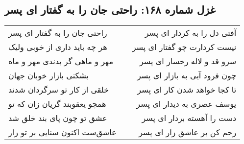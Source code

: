 \begin{center}
\section*{غزل شماره ۱۶۸: راحتی جان را به گفتار ای پسر}
\label{sec:168}
\begin{longtable}{l p{0.5cm} r}
راحتی جان را به گفتار ای پسر
&&
آفتی دل را به کردار ای پسر
\\
هر چه باید داری از خوبی ولیک
&&
نیست کردارت چو گفتار ای پسر
\\
مهر و ماهی گر بدندی مهر و ماه
&&
سرو قد و لاله رخسار ای پسر
\\
بشکنی بازار خوبان جهان
&&
چون فرود آیی به بازار ای پسر
\\
خلقی از کار تو سرگردان شدند
&&
تا کجا خواهد شدن کار ای پسر
\\
همچو یعقوبند گریان زان که تو
&&
یوسف عصری به دیدار ای پسر
\\
عشق تو چون پای بند خلق شد
&&
دست را آهسته بردار ای پسر
\\
عاشق‌ست اکنون سنایی بر تو زار
&&
رحم کن بر عاشق زار ای پسر
\\
\end{longtable}
\end{center}
